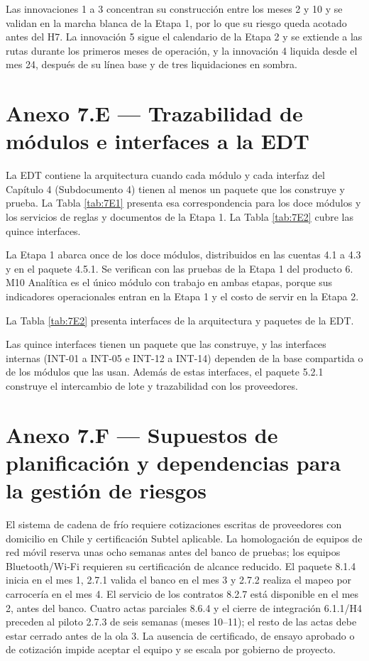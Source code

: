 
Las innovaciones 1 a 3 concentran su construcción entre los meses 2 y 10 y se validan en la marcha blanca de la Etapa 1, por lo que su riesgo queda acotado antes del H7. La innovación 5 sigue el calendario de la Etapa 2 y se extiende a las rutas durante los primeros meses de operación, y la innovación 4 liquida desde el mes 24, después de su línea base y de tres liquidaciones en sombra.

\section{Anexo 7.E — Trazabilidad de módulos e interfaces a la EDT}

La EDT contiene la arquitectura cuando cada módulo y cada interfaz del Capítulo 4 (Subdocumento 4) tienen al menos un paquete que los construye y prueba. La Tabla \ref{tab:7E1} presenta esa correspondencia para los doce módulos y los servicios de reglas y documentos de la Etapa 1. La Tabla \ref{tab:7E2} cubre las quince interfaces.


La Etapa 1 abarca once de los doce módulos, distribuidos en las cuentas 4.1 a 4.3 y en el paquete 4.5.1. Se verifican con las pruebas de la Etapa 1 del producto 6. M10 Analítica es el único módulo con trabajo en ambas etapas, porque sus indicadores operacionales entran en la Etapa 1 y el costo de servir en la Etapa 2.

La Tabla \ref{tab:7E2} presenta interfaces de la arquitectura y paquetes de la EDT.


Las quince interfaces tienen un paquete que las construye, y las interfaces internas (INT-01 a INT-05 e INT-12 a INT-14) dependen de la base compartida o de los módulos que las usan. Además de estas interfaces, el paquete 5.2.1 construye el intercambio de lote y trazabilidad con los proveedores.

\section{Anexo 7.F — Supuestos de planificación y dependencias para la gestión de riesgos}

El sistema de cadena de frío requiere cotizaciones escritas de proveedores con domicilio en Chile y certificación Subtel aplicable. La homologación de equipos de red móvil reserva unas ocho semanas antes del banco de pruebas; los equipos Bluetooth/Wi-Fi requieren su certificación de alcance reducido. El paquete 8.1.4 inicia en el mes 1, 2.7.1 valida el banco en el mes 3 y 2.7.2 realiza el mapeo por carrocería en el mes 4. El servicio de los contratos 8.2.7 está disponible en el mes 2, antes del banco. Cuatro actas parciales 8.6.4 y el cierre de integración 6.1.1/H4 preceden al piloto 2.7.3 de seis semanas (meses 10–11); el resto de las actas debe estar cerrado antes de la ola 3. La ausencia de certificado, de ensayo aprobado o de cotización impide aceptar el equipo y se escala por gobierno de proyecto.

